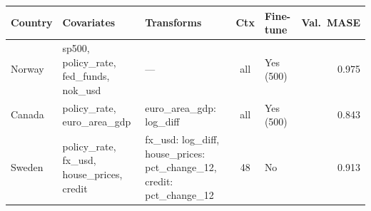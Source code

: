 \begin{tabular}{lllclr}
\toprule
Country & Covariates & Transforms & Ctx & Fine-tune & Val.\ MASE \\
\midrule
Norway & sp500, policy\_rate, fed\_funds, nok\_usd & --- & all & Yes (500) & 0.975 \\
Canada & policy\_rate, euro\_area\_gdp & euro\_area\_gdp: log\_diff & all & Yes (500) & 0.843 \\
Sweden & policy\_rate, fx\_usd, house\_prices, credit & fx\_usd: log\_diff, house\_prices: pct\_change\_12, credit: pct\_change\_12 & 48 & No & 0.913 \\
\bottomrule
\end{tabular}
